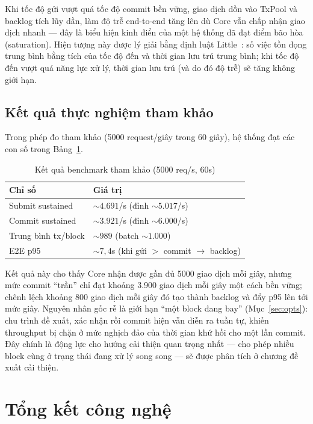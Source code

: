 Khi tốc độ gửi vượt quá tốc độ commit bền vững, giao dịch dồn vào TxPool và
backlog tích lũy dần, làm độ trễ end-to-end tăng lên dù Core vẫn chấp nhận
giao dịch nhanh --- đây là biểu hiện kinh điển của một hệ thống đã đạt điểm
bão hòa (saturation). Hiện tượng này được lý giải bằng định luật
Little~\cite{little1961law}: số việc tồn đọng trung bình bằng tích của tốc độ
đến và thời gian lưu trú trung bình; khi tốc độ đến vượt quá năng lực xử lý,
thời gian lưu trú (và do đó độ trễ) sẽ tăng không giới hạn.

\subsection{Kết quả thực nghiệm tham khảo}

Trong phép đo tham khảo (5000 request/giây trong 60 giây), hệ thống đạt các
con số trong Bảng~\ref{tab:bench-results}.

\begin{table}[H]
\centering
\caption{Kết quả benchmark tham khảo (5000 req/s, 60s)}
\label{tab:bench-results}
\begin{tabular}{@{}p{6cm}p{5cm}@{}}
\toprule
Chỉ số & Giá trị \\
\midrule
Submit sustained & ${\sim}4.691$/s (đỉnh ${\sim}5.017$/s) \\
Commit sustained & ${\sim}3.921$/s (đỉnh ${\sim}6.000$/s) \\
Trung bình tx/block & ${\sim}989$ (batch ${\sim}1.000$) \\
E2E p95 & ${\sim}7,4$s (khi gửi $>$ commit $\rightarrow$ backlog) \\
\bottomrule
\end{tabular}
\end{table}

Kết quả này cho thấy Core nhận được gần đủ 5000 giao dịch mỗi giây, nhưng
mức commit ``trần'' chỉ đạt khoảng 3.900 giao dịch mỗi giây một cách bền
vững; chênh lệch khoảng 800 giao dịch mỗi giây đó tạo thành backlog và đẩy
p95 lên tới mức giây. Nguyên nhân gốc rễ là giới hạn ``một block đang bay''
(Mục~\ref{sec:opts}): chu trình đề xuất, xác nhận rồi commit hiện vẫn diễn ra
tuần tự, khiến throughput bị chặn ở mức nghịch đảo của thời gian khứ hồi cho
một lần commit. Đây chính là động lực cho hướng cải thiện quan trọng nhất ---
cho phép nhiều block cùng ở trạng thái đang xử lý song song --- sẽ được phân
tích ở chương đề xuất cải thiện.


\section{Tổng kết công nghệ}
\label{sec:tech-summary}

